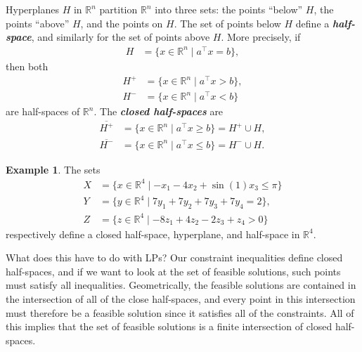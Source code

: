 \documentclass[a4paper, 12pt]{article}
\numberwithin{equation}{section}
\numberwithin{figure}{section}
\theoremstyle{definition}
\newtheorem{ex}[thm]{Example}
\renewcommand{\leq}{\leqslant}
\renewcommand{\geq}{\geqslant}
\newcommand{\R}{\mathbb{R}}
\newcommand{\define}[1]{\textbf{\textit{#1}}}
\begin{document}
Hyperplanes $H$ in $\R^n$ partition $\R^n$ into three sets: the points ``below''
$H$, the points ``above'' $H$, and the points on $H$. The set of points below
$H$ define a \define{half-space}, and similarly for the set of points above $H$. More precisely, if 
\begin{align*}
	H &= \{x\in \R^n \mid a^{\top}x = b\},
\end{align*}
then both 
\begin{align*}
	H^+ &= \{x\in \R^n \mid a^{\top}x > b \}, \\
	H^- &= \{x\in \R^n \mid a^{\top}x < b \}
\end{align*}
are half-spaces of $\R^n$. The \define{closed half-spaces} are 
\begin{align*}
	\overline{H^+} &= \{x\in \R^n \mid a^{\top}x \geq b \} = H^+ \cup H, \\
	\overline{H^-} &= \{x\in \R^n \mid a^{\top}x \leq b \} = H^- \cup H.
\end{align*}

\begin{ex}
	The sets 
	\begin{align*}
		X &= \{x\in \R^4 \mid -x_1 -4x_2 + \sin(1)x_3 \leq \pi \} \\
		Y &= \{y\in \R^4 \mid 7y_1 + 7y_2 + 7y_3 + 7y_4 = 2\}, \\
		Z &= \{z\in\R^4 \mid -8z_1 + 4z_2 - 2z_3 + z_4 > 0\}
	\end{align*}
	respectively define a closed half-space, hyperplane, and half-space in
	$\R^4$.
\end{ex}

What does this have to do with LPs? Our constraint inequalities define closed
half-spaces, and if we want to look at the set of feasible solutions, such
points must satisfy all inequalities. Geometrically, the feasible solutions are
contained in the intersection of all of the close half-spaces, and every point
in this intersection must therefore be a feasible solution since it satisfies
all of the constraints. All of this implies that the set of feasible solutions
is a finite intersection of closed half-spaces.
\end{document}
